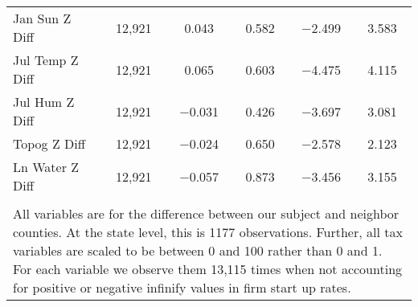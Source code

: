 \begin{table}[!htbp]
\begin{tabular}{@{\extracolsep{5pt}}lccccc}
Jan Sun Z Diff & 12,921 & 0.043 & 0.582 & $-$2.499 & 3.583 \\ 
Jul Temp Z Diff & 12,921 & 0.065 & 0.603 & $-$4.475 & 4.115 \\ 
Jul Hum Z Diff & 12,921 & $-$0.031 & 0.426 & $-$3.697 & 3.081 \\ 
Topog Z Diff & 12,921 & $-$0.024 & 0.650 & $-$2.578 & 2.123 \\ 
Ln Water Z Diff & 12,921 & $-$0.057 & 0.873 & $-$3.456 & 3.155 \\ 
\hline \\[-1.8ex] 
\multicolumn{6}{l}{All variables are for the difference between our subject and neighbor counties. At the state level, this is 1177 observations. Further, all tax variables are scaled to be between 0 and 100 rather than 0 and 1. For each variable we observe them 13,115 times when not accounting for positive or negative infinify values in firm start up rates.} \\ 
\end{tabular} 
\end{table} 
